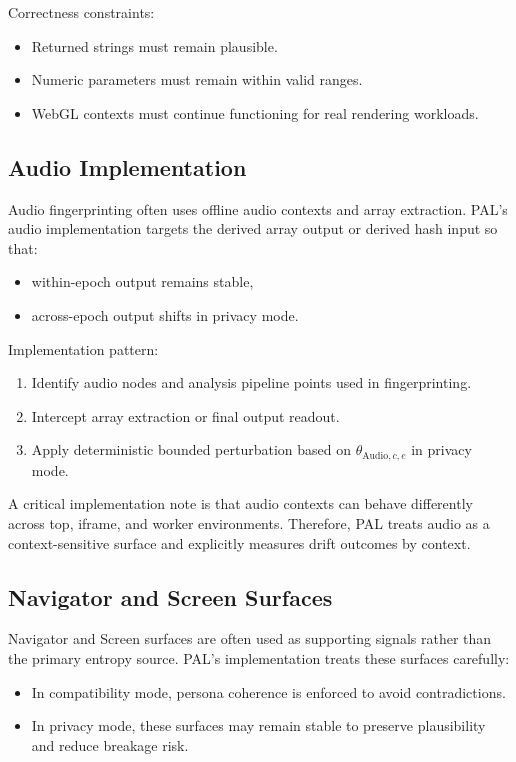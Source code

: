 \documentclass[11pt]{report}
\begin{document}
Correctness constraints:
\begin{itemize}
    \item Returned strings must remain plausible.
    \item Numeric parameters must remain within valid ranges.
    \item WebGL contexts must continue functioning for real rendering workloads.
\end{itemize}

\subsection{Audio Implementation}

Audio fingerprinting often uses offline audio contexts and array extraction. PAL’s audio implementation targets the derived array output or derived hash input so that:

\begin{itemize}
    \item within-epoch output remains stable,
    \item across-epoch output shifts in privacy mode.
\end{itemize}

Implementation pattern:
\begin{enumerate}
    \item Identify audio nodes and analysis pipeline points used in fingerprinting.
    \item Intercept array extraction or final output readout.
    \item Apply deterministic bounded perturbation based on $\theta_{\text{Audio},c,e}$ in privacy mode.
\end{enumerate}

A critical implementation note is that audio contexts can behave differently across top, iframe, and worker environments. Therefore, PAL treats audio as a context-sensitive surface and explicitly measures drift outcomes by context.

\subsection{Navigator and Screen Surfaces}

Navigator and Screen surfaces are often used as supporting signals rather than the primary entropy source. PAL’s implementation treats these surfaces carefully:

\begin{itemize}
    \item In compatibility mode, persona coherence is enforced to avoid contradictions.
    \item In privacy mode, these surfaces may remain stable to preserve plausibility and reduce breakage risk.
\end{itemize}
\end{document}
